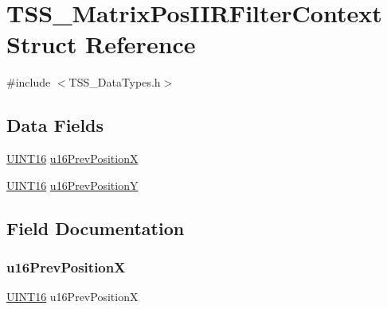 \hypertarget{struct_t_s_s___matrix_pos_i_i_r_filter_context}{}\section{T\+S\+S\+\_\+\+Matrix\+Pos\+I\+I\+R\+Filter\+Context Struct Reference}
\label{struct_t_s_s___matrix_pos_i_i_r_filter_context}


{\ttfamily \#include $<$T\+S\+S\+\_\+\+Data\+Types.\+h$>$}

\subsection*{Data Fields}
\begin{DoxyCompactItemize}
\item 
\hyperlink{_t_s_s___data_types_8h_a09f1a1fb2293e33483cc8d44aefb1eb1}{U\+I\+N\+T16} \hyperlink{struct_t_s_s___matrix_pos_i_i_r_filter_context_a2b60ec8343e1e947482f97774dbdc5eb}{u16\+Prev\+PositionX}
\item 
\hyperlink{_t_s_s___data_types_8h_a09f1a1fb2293e33483cc8d44aefb1eb1}{U\+I\+N\+T16} \hyperlink{struct_t_s_s___matrix_pos_i_i_r_filter_context_aa89f5ce74566f55212b55108c9d3647e}{u16\+Prev\+PositionY}
\end{DoxyCompactItemize}


\subsection{Field Documentation}
\mbox{\label{struct_t_s_s___matrix_pos_i_i_r_filter_context_a2b60ec8343e1e947482f97774dbdc5eb}} 
\subsubsection{\texorpdfstring{u16\+Prev\+PositionX}{u16PrevPositionX}}
{\footnotesize\ttfamily \hyperlink{_t_s_s___data_types_8h_a09f1a1fb2293e33483cc8d44aefb1eb1}{U\+I\+N\+T16} u16\+Prev\+PositionX}

\mbox{\label{struct_t_s_s___matrix_pos_i_i_r_filter_context_aa89f5ce74566f55212b55108c9d3647e}} 

